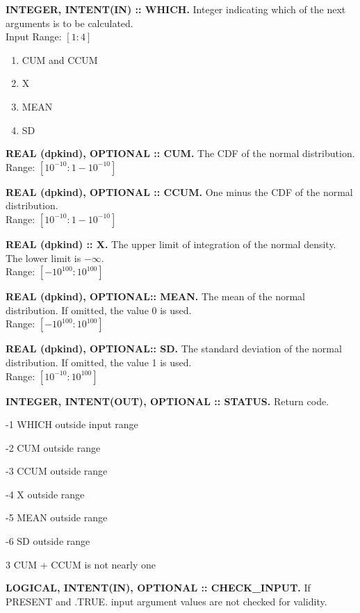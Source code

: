 \documentclass[12pt,dvips]{article}
\newcommand{\range}[2]{\hfill Range: \ensuremath{\left[ #1:#2
\right]}\\}
\newcommand{\inrange}[2]{\hfill Input Range: \ensuremath{\left[ #1:#2
\right]}\\}
\newcommand{\sprob}{10^{-10}}
\newcommand{\bprob}{1-\sprob}
\newcommand{\immense}{10^{100}}
\newcommand{\myitem}[1]{\item{\bf \color{Violet} #1 \normalcolor}}
\begin{document}
\begin{description}

\myitem{INTEGER, INTENT(IN)  :: WHICH.} Integer indicating  which of the
next arguments is to be calculated.\\
\inrange{1}{4}
\begin{enumerate}
\item CUM and CCUM
\item X
\item MEAN
\item SD
\end{enumerate}

\myitem{REAL  (dpkind), OPTIONAL ::  CUM.} The  CDF of  the  normal
distribution.\\
\range{\sprob}{\bprob}

\myitem{REAL (dpkind), OPTIONAL :: CCUM.} One minus the CDF of the
normal  distribution.\\
\range{\sprob}{\bprob}

\myitem{REAL  (dpkind) ::  X.}  The  upper limit  of integration  of the
normal     density.     The     lower     limit    is     $-\infty$.\\
\range{-\immense}{\immense}

\myitem{REAL (dpkind), OPTIONAL:: MEAN.} The mean of the normal
distribution.  If omitted, the value 0 is used.\\
\range{-\immense}{\immense}

\myitem{REAL (dpkind), OPTIONAL:: SD.} The standard deviation of the normal
distribution.  If omitted, the value 1 is used.\\
\range{\sprob}{\immense}

\myitem{INTEGER, INTENT(OUT), OPTIONAL :: STATUS.} Return code.
\begin{description}
\item{-1}  WHICH outside input range
\item{-2}  CUM outside range
\item{-3}  CCUM outside range
\item{-4}  X outside range
\item{-5}  MEAN outside range
\item{-6}  SD outside range
\item{3} CUM + CCUM is not nearly one
\end{description}

\myitem{LOGICAL, INTENT(IN), OPTIONAL :: CHECK\_INPUT.}  If PRESENT
and .TRUE. input argument values are not checked for validity.

\end{description}
\end{document}

